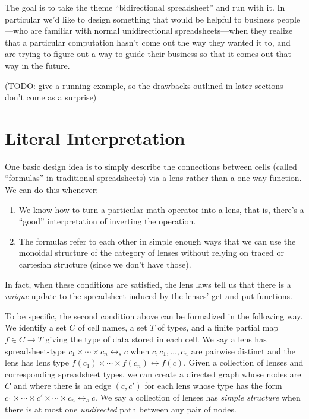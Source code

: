 \documentclass{article}
\newcommand{\lens}{\leftrightarrow}
\newcommand{\slens}{\lens_s}
\begin{document}
The goal is to take the theme ``bidirectional spreadsheet'' and run with it.
In particular we'd like to design something that would be helpful to
business people---who are familiar with normal unidirectional
spreadsheets---when they realize that a particular computation hasn't come
out the way they wanted it to, and are trying to figure out a way to guide
their business so that it comes out that way in the future.

(TODO: give a running example, so the drawbacks outlined in later sections
don't come as a surprise)

\section{Literal Interpretation}
\label{sec:naive}
One basic design idea is to simply describe the connections between cells
(called ``formulas'' in traditional spreadsheets) via a lens rather than a
one-way function. We can do this whenever:

\begin{enumerate}
    \item We know how to turn a particular math operator into a lens, that
        is, there's a ``good'' interpretation of inverting the operation.
    \item The formulas refer to each other in simple enough ways that we
        can use the monoidal structure of the category of lenses without
        relying on traced or cartesian structure (since we don't have
        those).
\end{enumerate}

In fact, when these conditions are satisfied, the lens laws tell us that
there is a \emph{unique} update to the spreadsheet induced by the lenses'
get and put functions.

To be specific, the second condition above can be formalized in the
following way. We identify a set $C$ of cell names, a set $T$ of types, and
a finite partial map $f \in C \to T$ giving the type of data stored in each
cell. We say a lens has spreadsheet-type $c_1 \times \cdots \times c_n
\slens c$ when $c, c_1, \ldots, c_n$ are pairwise distinct and the lens has
lens type $f(c_1) \times \cdots \times f(c_n) \lens f(c)$. Given a
collection of lenses and corresponding spreadsheet types, we can create a
directed graph whose nodes are $C$ and where there is an edge $(c,c')$ for
each lens whose type has the form $c_1 \times \cdots \times c' \times \cdots
\times c_n \slens c$. We say a collection of lenses has \emph{simple
structure} when there is at most one \emph{undirected} path between any pair
of nodes.
\end{document}
